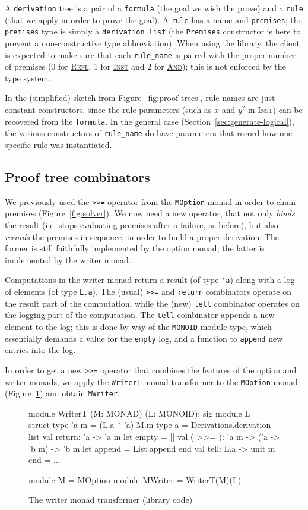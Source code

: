 \documentclass{easychair}
\def\li{\lstinline}
\let\TirName\textsc
\renewcommand{\DefTirName}[1]{\hyperlink{#1}{\TirName {#1}}}
\let\Rule\DefTirName
\newcommand{\fref}[1]{Figure~\ref{fig:#1}}
\newcommand{\sref}[1]{Section~\ref{sec:#1}}
\newcommand{\f}[1]{\ensuremath{#1^?}} %
\begin{document}
A \li+derivation+ tree is a pair of a \li+formula+ (the goal we wish the prove)
and a \li+rule+ (that we apply in order to prove the goal). A \li+rule+ has a name
and \li+premises+; the \li+premises+ type is simply a \li+derivation list+ (the
\li+Premises+ constructor is here to prevent a non-constructive type
abbreviation). When using the library, the client is expected to make sure
that each \li+rule_name+ is paired with the proper
number of premises (0 for \Rule{Refl}, 1 for
\Rule{Inst} and 2 for \Rule{And}); this is not enforced by the type system.

In the (simplified) sketch from \fref{proof-trees}, rule names are just constant
constructors, since the rule parameters (such as $x$ and $\f y$ in \Rule{Inst})
can be recovered from the \li+formula+. In the general case
(\sref{generate-logical}), the various constructors of \li+rule_name+ do have
parameters that record how one specific rule was instantiated.

\subsection{Proof tree combinators}

We previously used the \li+>>=+ operator from the \li+MOption+ monad in order to
chain premises (\fref{solver}). We now need a new operator, that not only
\emph{binds} the result (i.e. stops evaluating premises after a failure, as
before), but also \emph{records} the premises in sequence, in order to build a
proper derivation. The former is still faithfully implemented by the option
monad; the latter is implemented by the writer monad.

Computations in the writer monad return a result (of type \li+'a+) along with a log of
elements (of type \li+L.a+). The (usual) \li+>>=+ and \li+return+ combinators operate on
the result part of the computation, while the (new) \li+tell+ combinator
operates on the logging part of the computation. The \li+tell+ combinator
appends a new element to the log; this is done by way of the \li+MONOID+ module
type, which essentially demands a value for the \li+empty+ log, and a function
to \li+append+ new entries into the log.

In order to get a new \li+>>=+ operator that combines the features of
the option and writer monads, we apply the \li+WriterT+ monad transformer to the
\li+MOption+ monad (\fref{writer}) and obtain \li+MWriter+.

\begin{figure}
  \centering
\begin{ocaml}
module WriterT (M: MONAD) (L: MONOID): sig      module L = struct
  type 'a m = (L.a * 'a) M.m                      type a = Derivations.derivation list
  val return: 'a -> 'a m                          let empty = []
  val ( >>= ): 'a m -> ('a -> 'b m) -> 'b m       let append = List.append
                                                end
  val tell: L.a -> unit m
end = ...

module M = MOption
module MWriter = WriterT(M)(L)
\end{ocaml}
  \caption{The writer monad transformer (library code)}
  \label{fig:writer}
\end{figure}
\end{document}
